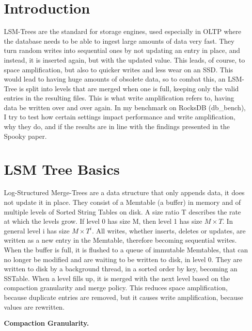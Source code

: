 \documentclass[sigconf]{acmart}
\begin{document}
\section{Introduction}
LSM-Trees are the standard for storage engines, used especially in OLTP where the database needs to be able to ingest large amounts of data very fast. They turn random writes into sequential ones by not updating an entry in place, and instead, it is inserted again, but with the updated value. This leads, of course, to space amplification, but also to quicker writes and less wear on an SSD. This would lead to having huge amounts of obsolete data, so to combat this, an LSM-Tree is split into levels that are merged when one is full, keeping only the valid entries in the resulting files. This is what write amplification refers to, having data be written over and over again. In my benchmark on RocksDB (db\_bench), I try to test how certain settings impact performance and write amplification, why they do, and if the results are in line with the findings presented in the Spooky\cite{Spooky} paper.


\section{LSM Tree Basics}
Log-Structured Merge-Trees are a data structure that only appends data, it does not update it in place. They consist of a Memtable (a buffer) in memory and of multiple levels of Sorted String Tables on disk. A size ratio T describes the rate at which the levels grow. If level 0 has size M, then level 1 has size $M \times T$. In general level i has size $M \times T^i$. All writes, whether inserts, deletes or updates, are written as a new entry in the Memtable, therefore becoming sequential writes. When the buffer is full, it is flushed to a queue of immutable Memtables, that can no longer be modified and are waiting to be written to disk, in level 0. They are written to disk by a background thread, in a sorted order by key, becoming an SSTable. When a level fills up, it is merged with the next level based on the compaction granularity and merge policy. This reduces space amplification, because duplicate entries are removed, but it causes write amplification, because values are rewritten. 

\textbf{Compaction Granularity.} 
\end{document}
